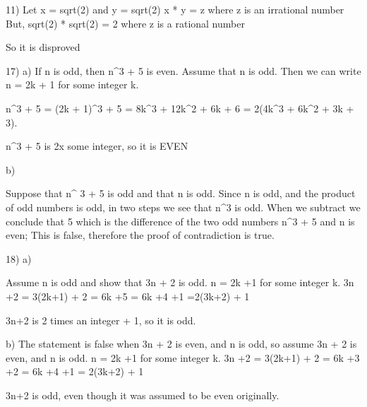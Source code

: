 11)
	Let x = sqrt(2) and y = sqrt(2)
	x * y = z where z is an irrational number
	But,
		sqrt(2) * sqrt(2) = 2 where z is a rational number

	So it is disproved

	
17)
	a) If n is odd, then n^3 + 5 is even. Assume that n is odd. Then we can write n = 2k + 1 for some integer k. 

		 n^3 + 5 = (2k + 1)^3 + 5 
			     = 8k^3 + 12k^2 + 6k + 6 
			     = 2(4k^3 + 6k^2 + 3k + 3).

	  n^3 + 5 is 2x some integer, so it is EVEN
	
	b) 
	
	Suppose that n^ 3 + 5 is odd and that n is odd. Since n is odd, and the product of odd numbers is odd, in two steps we see that n^3
	is odd. When we  subtract we conclude that 5 which is the difference of the two odd numbers n^3 + 5 and n is even; This is false,
	therefore the proof of contradiction is true.


18) 
	a)  

	Assume n is odd and show that 3n + 2 is odd.
	n = 2k +1 for some integer k.
	3n +2 = 3(2k+1) + 2
		 = 6k +5
		 = 6k +4 +1
		 =2(3k+2) + 1

	 3n+2 is 2 times an integer + 1, so it is odd. 

	b) The statement is false when 3n + 2 is even, and n is odd, so assume 3n + 2 is even, and n is odd.
	n = 2k +1 for some integer k.
	3n +2 = 3(2k+1) + 2
		 = 6k +3 +2
		 = 6k +4 +1
		 = 2(3k+2) + 1 

	 3n+2 is odd, even though it was assumed to be even originally.
		
